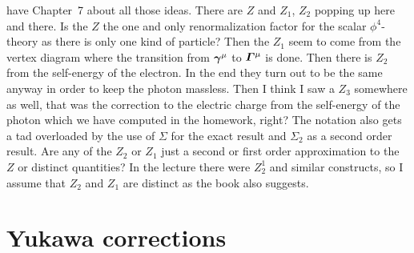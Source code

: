 \documentclass[11pt, english, fleqn, DIV=15, headinclude]{scrartcl}
\begin{document}
\begin{multicols}{2}
    \Textcite{Peskin/QFT/1995} have Chapter~7 about all those ideas. There are
    $Z$ and $Z_1$, $Z_2$ popping up here and there. Is the $Z$ the one and only
    renormalization factor for the scalar $\phi^4$-theory as there is only one
    kind of particle? Then the $Z_1$ seem to come from the vertex diagram where
    the transition from $\mat\gamma^\mu$ to $\mat\Gamma^\mu$ is done. Then
    there is $Z_2$ from the self-energy of the electron. In the end they turn
    out to be the same anyway in order to keep the photon massless. Then I
    think I saw a $Z_3$ somewhere as well, that was the correction to the
    electric charge from the self-energy of the photon which we have computed
    in the homework, right? The notation also gets a tad overloaded by the use
    of $\Sigma$ for the exact result and $\Sigma_2$ as a second order result.
    Are any of the $Z_2$ or $Z_1$ just a second or first order approximation to
    the $Z$ or distinct quantities? In the lecture there were $Z_2^1$ and
    similar constructs, so I assume that $Z_2$ and $Z_1$ are distinct as the
    book also suggests.
\end{multicols}

\section{Yukawa corrections}
\label{homework:1}
\end{document}
